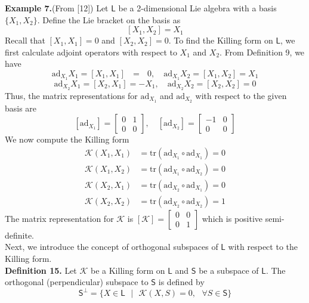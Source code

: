 \documentclass[11pt,a4paper]{article}
\begin{document}
\textbf{Example 7.}(From [12]) Let $\mathsf{L}$ be a 2-dimensional Lie algebra with a basis  $\{ X_1, X_2 \}$. Define the Lie bracket on the basis as 
$$[X_1, X_2] = X_1$$
Recall that $[X_1, X_1] = 0$ and $ [X_2, X_2] = 0$. To find the Killing form on $\mathsf{L}$, we first calculate adjoint operators with respect to $X_1$ and $X_2$. From Definition 9, we have
$$
\mathrm{ad}_{X_1}X_1 = [X_1, X_1] \text{ } = \text{ } 0, \quad
\mathrm{ad}_{X_1}X_2 = [X_1, X_2] = X_1
$$
$$ 
\mathrm{ad}_{X_2}X_1 = [X_2, X_1] = -X_1, \quad
\mathrm{ad}_{X_2}X_2 = [X_2, X_2] = 0
$$
Thus, the matrix representations for $\mathrm{ad}_{X_1}$ and $\mathrm{ad}_{X_2}$ with respect to the given basis are
$$
[\mathrm{ad}_{X_1}] = 
	\begin{bmatrix}
 		0 & 1 \\
 		0 & 0
 	\end{bmatrix}
 	, \quad
[\mathrm{ad}_{X_2}] = 
	\begin{bmatrix}
 		-1 & 0 \\
 		0 & 0
 	\end{bmatrix}
$$
We now compute the Killing form
\begin{align*}
\mathcal{K}(X_1,X_1) &= \mathrm{tr}(\mathrm{ad}_{X_1} \circ \mathrm{ad}_{X_1}) = 0 \\
\mathcal{K}(X_1,X_2) &= \mathrm{tr}(\mathrm{ad}_{X_1} \circ \mathrm{ad}_{X_2}) = 0 \\
\mathcal{K}(X_2,X_1) &= \mathrm{tr}(\mathrm{ad}_{X_2} \circ \mathrm{ad}_{X_1}) = 0 \\
\mathcal{K}(X_2,X_2) &= \mathrm{tr}(\mathrm{ad}_{X_2} \circ \mathrm{ad}_{X_2}) = 1
\end{align*}
The matrix representation for $\mathcal{K}$ is  
$
[\mathcal{K}] = 
	\begin{bmatrix}
 		0 & 0 \\
 		0 & 1
 	\end{bmatrix}
$
which is positive semi-definite.\\
 	
Next, we introduce the concept of orthogonal subspaces of $\mathsf{L}$ with respect to the Killing form.\\

\textbf{Definition 15.} Let $\mathcal{K}$ be a Killing form on $\mathsf{L}$ and $\mathsf{S}$ be a subspace of $\mathsf{L}$. The orthogonal (perpendicular) subspace to $\mathsf{S}$ is defined by
$$
\mathsf{S}^{\perp} = \{ X \in \mathsf{L} \text{ } \lvert \text{ } \mathcal{K}(X,S) = 0, \text{ } \forall S \in \mathsf{S} \}
$$
\end{document}
